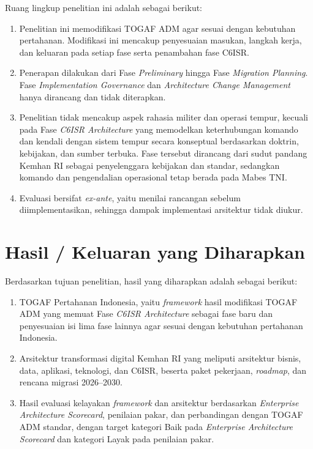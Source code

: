 Ruang lingkup penelitian ini adalah sebagai berikut:
\begin{enumerate}[label=\arabic*.]
\item Penelitian ini memodifikasi TOGAF ADM agar sesuai dengan kebutuhan pertahanan. Modifikasi ini mencakup penyesuaian masukan, langkah kerja, dan keluaran pada setiap fase serta penambahan fase C6ISR.
\item Penerapan dilakukan dari Fase \textit{Preliminary} hingga Fase \textit{Migration Planning}. Fase \textit{Implementation Governance} dan \textit{Architecture Change Management} hanya dirancang dan tidak diterapkan.
\item Penelitian tidak mencakup aspek rahasia militer dan operasi tempur, kecuali pada Fase \textit{C6ISR Architecture} yang memodelkan keterhubungan komando dan kendali dengan sistem tempur secara konseptual berdasarkan doktrin, kebijakan, dan sumber terbuka. Fase tersebut dirancang dari sudut pandang Kemhan RI sebagai penyelenggara kebijakan dan standar, sedangkan komando dan pengendalian operasional tetap berada pada Mabes TNI.
\item Evaluasi bersifat \textit{ex-ante}, yaitu menilai rancangan sebelum diimplementasikan, sehingga dampak implementasi arsitektur tidak diukur.
\end{enumerate}

\section{Hasil / Keluaran yang Diharapkan}
\label{sec:I.6}

Berdasarkan tujuan penelitian, hasil yang diharapkan adalah sebagai berikut:
\begin{enumerate}[label=\arabic*.]
\item TOGAF Pertahanan Indonesia, yaitu \textit{framework} hasil modifikasi TOGAF ADM yang memuat Fase \textit{C6ISR Architecture} sebagai fase baru dan penyesuaian isi lima fase lainnya agar sesuai dengan kebutuhan pertahanan Indonesia.
\item Arsitektur transformasi digital Kemhan RI yang meliputi arsitektur bisnis, data, aplikasi, teknologi, dan C6ISR, beserta paket pekerjaan, \textit{roadmap}, dan rencana migrasi 2026–2030.
\item Hasil evaluasi kelayakan \textit{framework} dan arsitektur berdasarkan \textit{Enterprise Architecture Scorecard}, penilaian pakar, dan perbandingan dengan TOGAF ADM standar, dengan target kategori Baik pada \textit{Enterprise Architecture Scorecard} dan kategori Layak pada penilaian pakar.
\end{enumerate}

